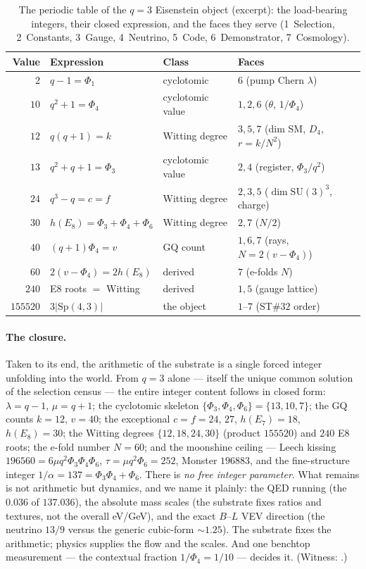 \documentclass[11pt]{article}
\begin{document}
\begin{table}[ht]\centering\small
\caption{The periodic table of the $q=3$ Eisenstein object (excerpt): the load-bearing
integers, their closed expression, and the faces they serve
(1~Selection, 2~Constants, 3~Gauge, 4~Neutrino, 5~Code, 6~Demonstrator, 7~Cosmology).}
\label{tab:periodic}
\begin{tabular}{@{}rlll@{}}
\toprule
Value & Expression & Class & Faces\\
\midrule
$2$ & $q-1=\Phi_1$ & cyclotomic & $6$ (pump Chern $\lambda$)\\
$10$ & $q^2+1=\Phi_4$ & cyclotomic value & $1,2,6$ ($\theta$, $1/\Phi_4$)\\
$12$ & $q(q+1)=k$ & Witting degree & $3,5,7$ (dim SM, $D_4$, $r{=}k/N^2$)\\
$13$ & $q^2+q+1=\Phi_3$ & cyclotomic value & $2,4$ (register, $\Phi_3/q^2$)\\
$24$ & $q^3-q=c{=}f$ & Witting degree & $2,3,5$ ($\dim\mathrm{SU}(3)^3$, charge)\\
$30$ & $h(E_8)=\Phi_3{+}\Phi_4{+}\Phi_6$ & Witting degree & $2,7$ ($N/2$)\\
$40$ & $(q+1)\Phi_4=v$ & GQ count & $1,6,7$ (rays, $N{=}2(v{-}\Phi_4)$)\\
$60$ & $2(v-\Phi_4)=2h(E_8)$ & derived & $7$ (e-folds $N$)\\
$240$ & E8 roots $=$ Witting & derived & $1,5$ (gauge lattice)\\
$155520$ & $3\lvert\mathrm{Sp}(4,3)\rvert$ & the object & $1$--$7$ (ST$\#32$ order)\\
\bottomrule
\end{tabular}
\end{table}

\paragraph{The closure.} Taken to its end, the arithmetic of the substrate is a single
forced integer unfolding into the world. From $q=3$ alone --- itself the unique common
solution of the selection census --- the entire integer content follows in closed form:
$\lambda=q-1$, $\mu=q+1$; the cyclotomic skeleton $\{\Phi_3,\Phi_4,\Phi_6\}=\{13,10,7\}$;
the GQ counts $k=12$, $v=40$; the exceptional $c{=}f=24$, $27$, $h(E_7)=18$, $h(E_8)=30$;
the Witting degrees $\{12,18,24,30\}$ (product $155520$) and $240$ E8 roots; the e-fold
number $N=60$; and the moonshine ceiling --- Leech kissing
$196560=6\mu q^2\Phi_3\Phi_4\Phi_6$, $\tau=\mu q^2\Phi_6=252$, Monster $196883$, and the
fine-structure integer $1/\alpha=137=\Phi_3\Phi_4+\Phi_6$. There is \emph{no free
integer parameter}. What remains is not arithmetic but dynamics, and we name it plainly:
the QED running (the $0.036$ of $137.036$), the absolute mass scales (the substrate
fixes ratios and textures, not the overall eV/GeV), and the exact $B$--$L$ VEV direction
(the neutrino $13/9$ versus the generic cubic-form $\sim1.25$). The substrate fixes the
arithmetic; physics supplies the flow and the scales. And one benchtop measurement ---
the contextual fraction $1/\Phi_4=1/10$ --- decides it. (Witness:
.)
\end{document}
